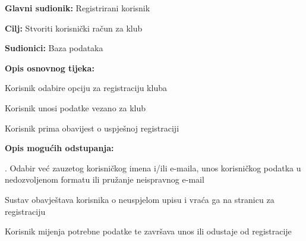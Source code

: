 					\noindent {}
					\begin{packed_item}
	
						\item \textbf{Glavni sudionik: }Registrirani korisnik
						\item  \textbf{Cilj:} Stvoriti korisnički račun za klub
						\item  \textbf{Sudionici:} Baza podataka
						\item  \textbf{Opis osnovnog tijeka:						
						}
						
						\item[] \begin{packed_enum}
	
							\item Korisnik odabire opciju za registraciju kluba
							\item Korisnik unosi podatke vezano za klub
							\item Korisnik prima obavijest o uspješnoj registraciji
							
						\end{packed_enum}
						
						\item  \textbf{Opis mogućih odstupanja:}
						
						\item[] \begin{packed_item}
	
							\item[4.a] . Odabir već zauzetog korisničkog imena i/ili e-maila, unos korisničkog podatka u nedozvoljenom formatu ili pružanje neispravnog e-mail

							\item[] \begin{packed_enum}
								
								\item Sustav obavještava korisnika o neuspjelom upisu i vraća ga na stranicu za registraciju
								\item Korisnik mijenja potrebne podatke te završava unos ili 
odustaje od registracije
																
							\end{packed_enum}
														
						\end{packed_item}
					\end{packed_item}
					
